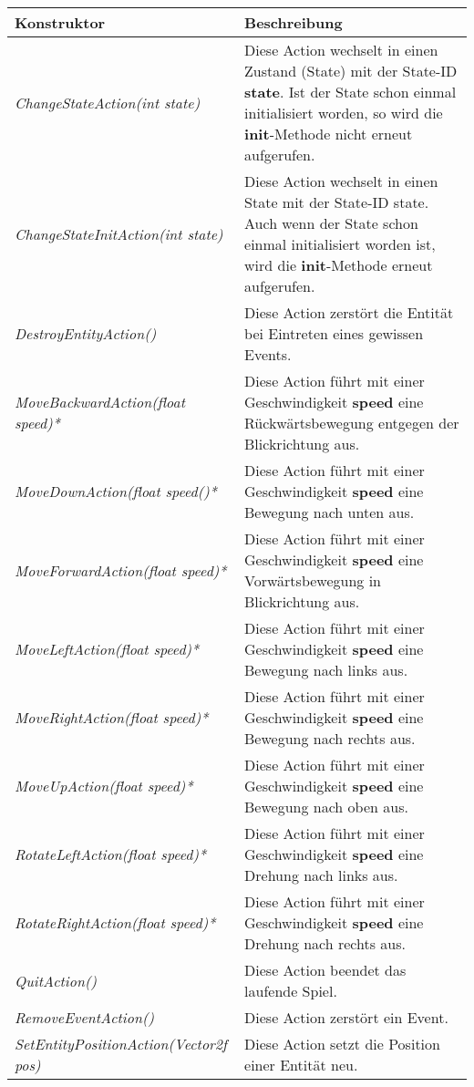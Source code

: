 
\begin{table}[htbp]
\begin{tabular}{|p{}|p{}|}\hline
\textbf{Konstruktor} & \textbf{Beschreibung}\\\hline\hline
\emph{ChangeStateAction(int state)} & Diese Action wechselt in einen Zustand (State) mit der State-ID \textbf{state}. Ist der State schon einmal initialisiert worden, so wird die \textbf{init}-Methode nicht erneut aufgerufen.\\\hline
\emph{ChangeStateInitAction(int state)} & Diese Action wechselt in einen State mit der State-ID state. Auch wenn der State schon einmal initialisiert worden ist, 
wird die \textbf{init}-Methode erneut aufgerufen.\\\hline
\emph{DestroyEntityAction()} & Diese Action zerstört die Entität bei Eintreten eines gewissen Events.\\\hline
\emph{MoveBackwardAction(float speed)*} & Diese Action führt mit einer Geschwindigkeit \textbf{speed} eine Rückwärtsbewegung entgegen der Blickrichtung aus.\\\hline
\emph{MoveDownAction(float speed()*} & Diese Action führt mit einer Geschwindigkeit \textbf{speed} eine Bewegung nach unten aus.\\\hline
\emph{MoveForwardAction(float speed)*} & Diese Action führt mit einer Geschwindigkeit \textbf{speed} eine Vorwärtsbewegung in Blickrichtung aus.\\\hline
\emph{MoveLeftAction(float speed)*} & Diese Action führt mit einer Geschwindigkeit \textbf{speed} eine Bewegung nach links aus.\\\hline
\emph{MoveRightAction(float speed)*} & Diese Action führt mit einer Geschwindigkeit \textbf{speed} eine Bewegung nach rechts aus.\\\hline
\emph{MoveUpAction(float speed)*} & Diese Action führt mit einer Geschwindigkeit \textbf{speed} eine Bewegung nach oben aus.\\\hline
\emph{RotateLeftAction(float speed)*} & Diese Action führt mit einer Geschwindigkeit \textbf{speed} eine Drehung nach links aus.\\\hline
\emph{RotateRightAction(float speed)*} & Diese Action führt mit einer Geschwindigkeit \textbf{speed} eine Drehung nach rechts aus.\\\hline
\emph{QuitAction()} & Diese Action beendet das laufende Spiel.\\\hline
\emph{RemoveEventAction()} & Diese Action zerstört ein Event.\\\hline
\emph{SetEntityPositionAction(Vector2f pos)} & Diese Action setzt die Position einer Entität neu.\\\hline


\end{tabular}
\end{table}
